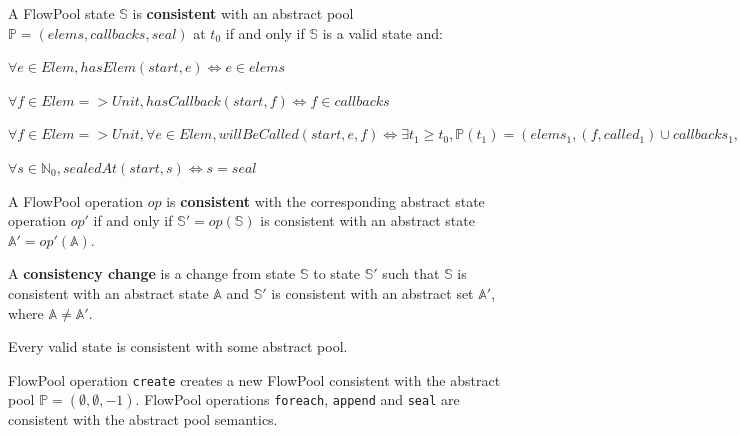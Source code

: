 \documentclass[runningheads,a4paper]{llncs}
\begin{document}
\begin{definition}[Consistency]
A FlowPool state $\mathbb{S}$ is \textbf{consistent} with an abstract pool 
$\mathbb{P} = (elems, callbacks, seal)$ at $t_0$ if and only if $\mathbb{S}$ 
is a valid state and:
\begin{description}
\item $\forall e \in Elem, hasElem(start, e) \Leftrightarrow e \in elems$
\item $\forall f \in Elem => Unit, hasCallback(start, f) \Leftrightarrow f \in callbacks$
\item $\forall f \in Elem => Unit, \forall e \in Elem, willBeCalled(start, e, f) \Leftrightarrow \exists t_1 \geq t_0, \mathbb{P}(t_1) = (elems_1, (f, called_1) \cup callbacks_1, seal_1), elems \subseteq called_1$
\item $\forall s \in \mathbb{N}_0, sealedAt(start, s) \Leftrightarrow s = seal$
\end{description}

A FlowPool operation $op$ is \textbf{consistent} with the corresponding 
abstract state operation $op'$ if and only if $\mathbb{S'}=op(\mathbb{S})$ is consistent 
with an abstract state $\mathbb{A'}=op'(\mathbb{A})$.

A \textbf{consistency change} 
is a change from state $\mathbb{S}$ to state $\mathbb{S'}$ such that $\mathbb{S}$ 
is consistent with an abstract state $\mathbb{A}$ and $\mathbb{S'}$ is consistent 
with an abstract set $\mathbb{A'}$, where $\mathbb{A} \neq \mathbb{A'}$.

\end{definition}


\begin{proposition}
Every valid state is consistent with some abstract pool.
\end{proposition}


\begin{theorem}[Safety]
FlowPool operation \verb=create= creates a new FlowPool consistent with the abstract pool 
$\mathbb{P} = (\emptyset, \emptyset, -1)$. FlowPool operations \verb=foreach=, \verb=append= 
and \verb=seal= are consistent with the abstract pool semantics.
\end{theorem}
\end{document}
